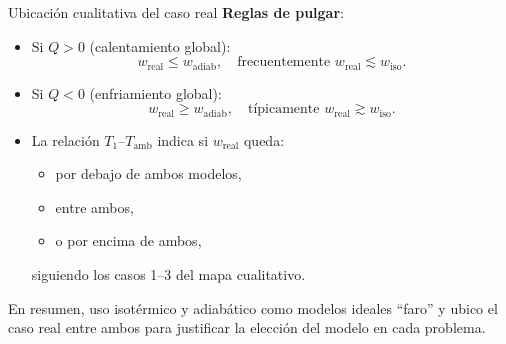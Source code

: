 \documentclass[aspectratio=169]{beamer}
\begin{document}

\begin{frame}{Ubicación cualitativa del caso real}
\textbf{Reglas de pulgar}:

\begin{itemize}
  \item Si $Q>0$ (calentamiento global):
  \[
  w_{\text{real}} \le w_{\text{adiab}},
  \quad
  \text{frecuentemente } w_{\text{real}} \lesssim w_{\text{iso}}.
  \]
  \item Si $Q<0$ (enfriamiento global):
  \[
  w_{\text{real}} \ge w_{\text{adiab}},
  \quad
  \text{típicamente } w_{\text{real}} \gtrsim w_{\text{iso}}.
  \]
  \item La relación $T_1$--$T_{\text{amb}}$ indica si $w_{\text{real}}$ queda:
  \begin{itemize}
    \item por debajo de ambos modelos,
    \item entre ambos,
    \item o por encima de ambos,
  \end{itemize}
  siguiendo los casos 1--3 del mapa cualitativo.
\end{itemize}

\bigskip
En resumen, uso isotérmico y adiabático como modelos ideales ``faro'' y ubico
el caso real entre ambos para justificar la elección del modelo en cada problema.
\end{frame}

\end{document}
